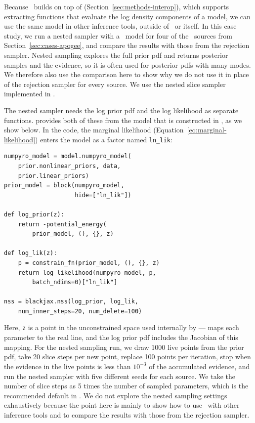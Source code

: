 \documentclass[twocolumn]{AASTeX7/aastex701}
\newcommand{\harv}{\package{harv}}
\begin{document}
Because \harv\ builds on top of  (Section~\ref{sec:methods-interop}),
which supports extracting functions that evaluate the log density components of a model,
we can use the same model in other inference tools, outside of \harv\ or
 itself.
In this case study, we run a nested sampler \citep{Skilling:2004, Skilling:2006} with a
\harv\ model for four of the \apogee\ sources from Section~\ref{sec:cases-apogee}, and
compare the results with those from the rejection sampler.
Nested sampling explores the full prior pdf and returns posterior samples and the
evidence, so it is often used for posterior pdfs with many modes.
We therefore also use the comparison here to show why we do not use it in place of the
rejection sampler for every source.
We use the nested slice sampler \citep{Yallup:2026} implemented in 
\citep{Cabezas:2024}.

The nested sampler needs the log prior pdf and the log likelihood as separate functions.
 provides both of these from the model that is constructed in \harv, as
we show below.
In the code, the marginal likelihood (Equation~\ref{eq:marginal-likelihood}) enters the
model as a factor named \texttt{ln\_lik}:
\begin{lstlisting}
numpyro_model = model.numpyro_model(
    prior.nonlinear_priors, data,
    prior.linear_priors)
prior_model = block(numpyro_model,
                    hide=["ln_lik"])

def log_prior(z):
    return -potential_energy(
        prior_model, (), {}, z)

def log_lik(z):
    p = constrain_fn(prior_model, (), {}, z)
    return log_likelihood(numpyro_model, p,
        batch_ndims=0)["ln_lik"]

nss = blackjax.nss(log_prior, log_lik,
    num_inner_steps=20, num_delete=100)
\end{lstlisting}
\noindent
Here, \texttt{z} is a point in the unconstrained space used internally by
 ---  maps each parameter to the real line, and the
log prior pdf includes the Jacobian of this mapping.
For the nested sampling run, we draw 1000 live points from the prior pdf, take 20 slice
steps per new point, replace 100 points per iteration, stop when the evidence in the
live points is less than $10^{-3}$ of the accumulated evidence, and run the nested
sampler with five different seeds for each source.
We take the number of slice steps as 5 times the number of sampled parameters, which is
the recommended default in  \citep{Handley:2015}.
We do not explore the nested sampling settings exhaustively because the point here is
mainly to show how to use \harv\ with other inference tools and to compare the results
with those from the rejection sampler.
\end{document}
